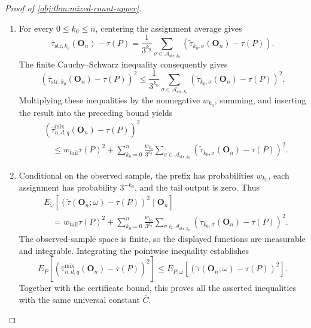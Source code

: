 \documentclass[11pt]{article}
\begin{document}
\begin{proof}[Proof of \cref{obj:thm:mixed-count-upper}]
\begin{enumerate}
\item For every \(0\le k_0\le n\), centering the assignment average gives
\[
\overline\tau_{\mathrm{str},k_0}(\mathbf O_n)-\tau(P)
=
\frac{1}{3^{k_0}}
\sum_{\sigma\in\mathcal A_{\mathrm{str},k_0}}
\left(
\widetilde\tau_{k_0,\sigma}(\mathbf O_n)-\tau(P)
\right).
\]
The finite Cauchy--Schwarz inequality consequently gives
\[
\left(
\overline\tau_{\mathrm{str},k_0}(\mathbf O_n)-\tau(P)
\right)^2
\le
\frac{1}{3^{k_0}}
\sum_{\sigma\in\mathcal A_{\mathrm{str},k_0}}
\left(
\widetilde\tau_{k_0,\sigma}(\mathbf O_n)-\tau(P)
\right)^2.
\]
Multiplying these inequalities by the nonnegative \(w_{k_0}\), summing, and inserting the result into the preceding bound yields
\[
\begin{aligned}
&\left(
\widehat\tau^{\mathrm{mix}}_{n,d,q}(\mathbf O_n)-\tau(P)
\right)^2\\
&\quad\le
w_{\mathrm{tail}}\tau(P)^2
+
\sum_{k_0=0}^{n}\frac{w_{k_0}}{3^{k_0}}
\sum_{\sigma\in\mathcal A_{\mathrm{str},k_0}}
\left(
\widetilde\tau_{k_0,\sigma}(\mathbf O_n)-\tau(P)
\right)^2.
\end{aligned}
\]

\item Conditional on the observed sample, the prefix has probabilities \(w_{k_0}\), each assignment has probability \(3^{-k_0}\), and the tail output is zero. Thus
\[
\begin{aligned}
&E_\omega\!\left[
\left(\widetilde\tau(\mathbf O_n;\omega)-\tau(P)\right)^2
\mid\mathbf O_n
\right]\\
&\quad=
w_{\mathrm{tail}}\tau(P)^2
+
\sum_{k_0=0}^{n}\frac{w_{k_0}}{3^{k_0}}
\sum_{\sigma\in\mathcal A_{\mathrm{str},k_0}}
\left(
\widetilde\tau_{k_0,\sigma}(\mathbf O_n)-\tau(P)
\right)^2.
\end{aligned}
\]
The observed-sample space is finite, so the displayed functions are measurable and integrable. Integrating the pointwise inequality establishes
\[
E_P\!\left[
\left(
\widehat\tau^{\mathrm{mix}}_{n,d,q}(\mathbf O_n)-\tau(P)
\right)^2
\right]
\le
E_{P,\omega}\!\left[
\left(
\widetilde\tau(\mathbf O_n;\omega)-\tau(P)
\right)^2
\right].
\]
Together with the certificate bound, this proves all the asserted inequalities with the same universal constant \(\overline C\).
\end{enumerate}
\end{proof}
\end{document}
